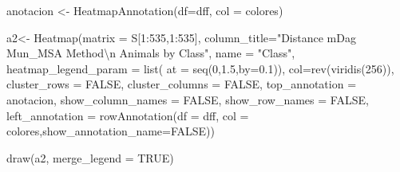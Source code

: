 \documentclass[
  letterpaper,
  DIV=11,
  numbers=noendperiod]{scrreprt}
\newenvironment{Shaded}{\begin{snugshade}}{\end{snugshade}}
\newcommand{\AttributeTok}[1]{\textcolor[rgb]{0.40,0.45,0.13}{#1}}
\newcommand{\ConstantTok}[1]{\textcolor[rgb]{0.56,0.35,0.01}{#1}}
\newcommand{\DecValTok}[1]{\textcolor[rgb]{0.68,0.00,0.00}{#1}}
\newcommand{\FloatTok}[1]{\textcolor[rgb]{0.68,0.00,0.00}{#1}}
\newcommand{\FunctionTok}[1]{\textcolor[rgb]{0.28,0.35,0.67}{#1}}
\newcommand{\NormalTok}[1]{\textcolor[rgb]{0.00,0.23,0.31}{#1}}
\newcommand{\OtherTok}[1]{\textcolor[rgb]{0.00,0.23,0.31}{#1}}
\newcommand{\SpecialCharTok}[1]{\textcolor[rgb]{0.37,0.37,0.37}{#1}}
\newcommand{\StringTok}[1]{\textcolor[rgb]{0.13,0.47,0.30}{#1}}
\begin{document}
\begin{Shaded}
\begin{Highlighting}[]
\NormalTok{anotacion }\OtherTok{\textless{}{-}} \FunctionTok{HeatmapAnnotation}\NormalTok{(}\AttributeTok{df=}\NormalTok{dff, }\AttributeTok{col =}\NormalTok{ colores)}


\NormalTok{a2}\OtherTok{\textless{}{-}} \FunctionTok{Heatmap}\NormalTok{(}\AttributeTok{matrix =}\NormalTok{ S[}\DecValTok{1}\SpecialCharTok{:}\DecValTok{535}\NormalTok{,}\DecValTok{1}\SpecialCharTok{:}\DecValTok{535}\NormalTok{], }
              \AttributeTok{column\_title=}\StringTok{"Distance mDag Mun\_MSA Method}\SpecialCharTok{\textbackslash{}n}\StringTok{  Animals by Class"}\NormalTok{,}
            \AttributeTok{name =} \StringTok{"Class"}\NormalTok{, }
            \AttributeTok{heatmap\_legend\_param =} \FunctionTok{list}\NormalTok{(}
    \AttributeTok{at =} \FunctionTok{seq}\NormalTok{(}\DecValTok{0}\NormalTok{,}\FloatTok{1.5}\NormalTok{,}\AttributeTok{by=}\FloatTok{0.1}\NormalTok{)),}
        \AttributeTok{col=}\FunctionTok{rev}\NormalTok{(}\FunctionTok{viridis}\NormalTok{(}\DecValTok{256}\NormalTok{)),}
        \AttributeTok{cluster\_rows =} \ConstantTok{FALSE}\NormalTok{,}
        \AttributeTok{cluster\_columns =} \ConstantTok{FALSE}\NormalTok{,}
        \AttributeTok{top\_annotation =}\NormalTok{ anotacion,}
        \AttributeTok{show\_column\_names =} \ConstantTok{FALSE}\NormalTok{, }
        \AttributeTok{show\_row\_names =} \ConstantTok{FALSE}\NormalTok{,}
        \AttributeTok{left\_annotation =} \FunctionTok{rowAnnotation}\NormalTok{(}\AttributeTok{df =}\NormalTok{ dff, }\AttributeTok{col =}\NormalTok{ colores,}\AttributeTok{show\_annotation\_name=}\ConstantTok{FALSE}\NormalTok{))}
  
\FunctionTok{draw}\NormalTok{(a2, }\AttributeTok{merge\_legend =} \ConstantTok{TRUE}\NormalTok{)}
\end{Highlighting}
\end{Shaded}
\end{document}
